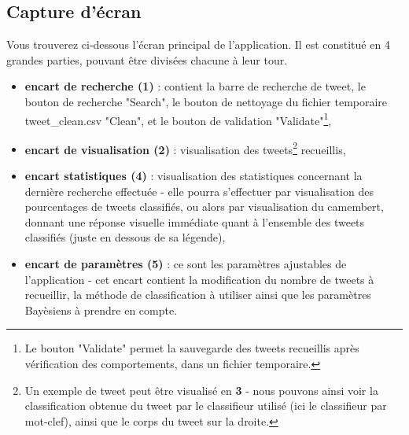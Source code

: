 \documentclass[pdftex,12pt,a4paper]{report}
\begin{document}
\begin{spacing}{1.2}
\subsection{Capture d'écran}

Vous trouverez ci-dessous l'écran principal de l'application. Il est constitué en 4 grandes parties, pouvant être divisées chacune à leur tour.
\begin{itemize}
\item{\textbf{encart de recherche (1)} : contient la barre de recherche de tweet, le bouton de recherche "Search", le bouton de nettoyage du fichier temporaire tweet\_clean.csv "Clean", et le bouton de validation "Validate"\footnote{Le bouton "Validate" permet la sauvegarde des tweets recueillis après vérification des comportements, dans un fichier temporaire.},}
\item{\textbf{encart de visualisation (2)} : visualisation des tweets\footnote{Un exemple de tweet peut être visualisé en \textbf{3} - nous pouvons ainsi voir la classification obtenue du tweet par le classifieur utilisé (ici le classifieur par mot-clef), ainsi que le corps du tweet sur la droite.} recueillis,}
\item{\textbf{encart statistiques (4)} : visualisation des statistiques concernant la dernière recherche effectuée - elle pourra s'effectuer par visualisation des pourcentages de tweets classifiés, ou alors par visualisation du camembert, donnant une réponse visuelle immédiate quant à l'ensemble des tweets classifiés (juste en dessous de sa légende),}
\item{\textbf{encart de paramètres (5)} : ce sont les paramètres ajustables de l'application - cet encart contient la modification du nombre de tweets à recueillir, la méthode de classification à utiliser ainsi que les paramètres Bayèsiens à prendre en compte.}
\end{itemize}



\end{spacing}
\end{document}
